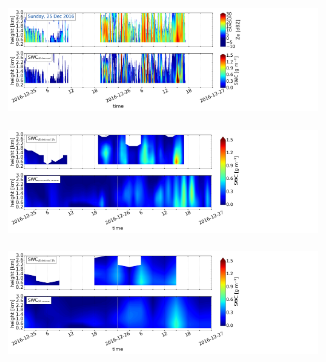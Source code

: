 \begin{figure}[t]\ContinuedFloat
	\centering
    \begin{subfigure}[t]{\textwidth}
    \centering
    	\includegraphics[trim={0.cm 2.2cm 19.cm 0.5cm},clip,width=0.9\textwidth]{./fig_obs_ret/20161225}
		\caption{}\label{fig:SWC:ret_25}
    \end{subfigure}
    \begin{subfigure}[t]{\textwidth}
    \centering
    	\includegraphics[trim={0.cm 2.2cm 19.cm 0.5cm},clip,width=0.9\textwidth]{./fig_vert_SWC_EM/20161225}
		\caption{}\label{fig:SWC_EM:25}
    \end{subfigure}
    \begin{subfigure}[t]{\textwidth}
    \centering
    	\includegraphics[trim={0.cm 0.8cm 19.cm 0.5cm},clip,width=0.9\textwidth]{./fig_vert_SWC_3h/20161225}
		\caption{}\label{fig:SWC3h:25}
    \end{subfigure}
\end{figure}
